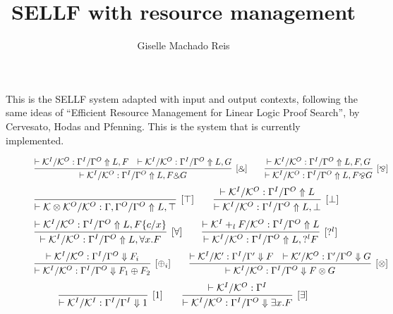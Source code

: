 \documentclass[a4paper, 11pt]{article}
\title{SELLF with resource management}
\author{Giselle Machado Reis}
\begin{document}
\maketitle

This is the SELLF system adapted with input and output contexts, following the
same ideas of ``Efficient Resource Management for Linear Logic Proof Search'',
by Cervesato, Hodas and Pfenning. This is the system that is currently
implemented.

\begin{figure}[t]
$$
\infer[\text{[$\binampersand$]}]{\vdash \mathcal{K}^I / \mathcal{K}^O : \Gamma^I
/ \Gamma^O \Uparrow L, F \binampersand G}{\vdash \mathcal{K}^I / \mathcal{K}^O :
\Gamma^I / \Gamma^O \Uparrow L, F & \vdash \mathcal{K}^I / \mathcal{K}^O :
\Gamma^I / \Gamma^O \Uparrow L, G}
\qquad
\infer[\text{[$\bindnasrepma$]}]{\vdash \mathcal{K}^I / \mathcal{K}^O : \Gamma^I
/ \Gamma^O \Uparrow L, F \bindnasrepma G}{\vdash \mathcal{K}^I / \mathcal{K}^O :
\Gamma^I / \Gamma^O \Uparrow L, F, G}
$$
\vspace{-2.5mm}
$$
\infer[\text{[$\top$]}]{\vdash \mathcal{K} \otimes \mathcal{K}^O / \mathcal{K}^O:
\Gamma, \Gamma^O / \Gamma^O \Uparrow L, \top}{}
\qquad
\infer[\text{[$\bot$]}]{\vdash \mathcal{K}^I / \mathcal{K}^O : \Gamma^I /
\Gamma^O \Uparrow L, \bot}{\vdash \mathcal{K}^I / \mathcal{K}^O : \Gamma^I /
\Gamma^O \Uparrow L}
$$
\vspace{-2.5mm}
$$
\infer[\text{[$\forall$]}]{\vdash \mathcal{K}^I / \mathcal{K}^O : \Gamma^I /
\Gamma^O \Uparrow L, \forall x.F}{\vdash \mathcal{K}^I / \mathcal{K}^O :
\Gamma^I / \Gamma^O \Uparrow L, F\{c/x\}}
\qquad 
\infer[\text{[$?^l$]}]{\vdash \mathcal{K}^I / \mathcal{K}^O : \Gamma^I /
\Gamma^O \Uparrow L, ?^l F}{\vdash \mathcal{K}^I +_l F / \mathcal{K}^O :
\Gamma^I / \Gamma^O \Uparrow L}
$$
\vspace{-2.5mm}
$$
\infer[\text{[$\oplus_i$]}]{\vdash \mathcal{K}^I / \mathcal{K}^O : \Gamma^I /
\Gamma^O \Downarrow F_1 \oplus F_2}{\vdash \mathcal{K}^I / \mathcal{K}^O :
\Gamma^I / \Gamma^O \Downarrow F_i}
\qquad
\infer[\text{[$\otimes$]}]{\vdash \mathcal{K}^I / \mathcal{K}^O : \Gamma^I /
\Gamma^O \Downarrow F \otimes G}{\vdash \mathcal{K}^I / \mathcal{K}' : \Gamma^I
/ \Gamma' \Downarrow F & \vdash \mathcal{K}' / \mathcal{K}^O : \Gamma' /
\Gamma^O \Downarrow G}
$$
\vspace{-2.5mm}
$$
\infer[\text{[1]}]{\vdash \mathcal{K}^I / \mathcal{K}^I : \Gamma^I / \Gamma^I
\Downarrow 1}{}
\qquad
\infer[\text{[$\exists$]}]{\vdash \mathcal{K}^I / \mathcal{K}^O : \Gamma^I /
\Gamma^O \Downarrow \exists x.F}{\vdash \mathcal{K}^I / \mathcal{K}^O : \Gamma^I
}$$
\end{figure}
\end{document}

